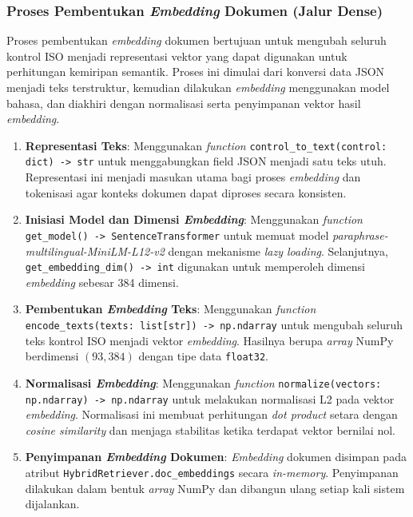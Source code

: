 \documentclass[12pt,a4paper]{article}
\begin{document}
\subsubsection*{Proses Pembentukan \textit{Embedding} Dokumen (Jalur Dense)}

Proses pembentukan \textit{embedding} dokumen bertujuan untuk mengubah seluruh kontrol ISO menjadi representasi vektor yang dapat digunakan untuk perhitungan kemiripan semantik. Proses ini dimulai dari konversi data JSON menjadi teks terstruktur, kemudian dilakukan \textit{embedding} menggunakan model bahasa, dan diakhiri dengan normalisasi serta penyimpanan vektor hasil \textit{embedding}.

\begin{enumerate}[label=\alph*., leftmargin=1.1cm]
\item \textbf{Representasi Teks}: Menggunakan \textit{function} \texttt{control\_to\_text(control: dict) -> str} untuk menggabungkan field JSON menjadi satu teks utuh. Representasi ini menjadi masukan utama bagi proses \textit{embedding} dan tokenisasi agar konteks dokumen dapat diproses secara konsisten.

\item \textbf{Inisiasi Model dan Dimensi \textit{Embedding}}: Menggunakan \textit{function} \texttt{get\_model() -> SentenceTransformer} untuk memuat model \textit{paraphrase-multilingual-MiniLM-L12-v2} dengan mekanisme \textit{lazy loading}. Selanjutnya, \texttt{get\_embedding\_dim() -> int} digunakan untuk memperoleh dimensi \textit{embedding} sebesar 384 dimensi.

\item \textbf{Pembentukan \textit{Embedding} Teks}: Menggunakan \textit{function} \texttt{encode\_texts(texts: list[str]) -> np.ndarray} untuk mengubah seluruh teks kontrol ISO menjadi vektor \textit{embedding}. Hasilnya berupa \textit{array} NumPy berdimensi $(93, 384)$ dengan tipe data \texttt{float32}.

\item \textbf{Normalisasi \textit{Embedding}}: Menggunakan \textit{function} \texttt{normalize(vectors: np.ndarray) -> np.ndarray} untuk melakukan normalisasi L2 pada vektor \textit{embedding}. Normalisasi ini membuat perhitungan \textit{dot product} setara dengan \textit{cosine similarity} dan menjaga stabilitas ketika terdapat vektor bernilai nol.

\item \textbf{Penyimpanan \textit{Embedding} Dokumen}: \textit{Embedding} dokumen disimpan pada atribut \texttt{HybridRetriever.doc\_embeddings} secara \textit{in-memory}. Penyimpanan dilakukan dalam bentuk \textit{array} NumPy dan dibangun ulang setiap kali sistem dijalankan.
\end{enumerate}
\end{document}
